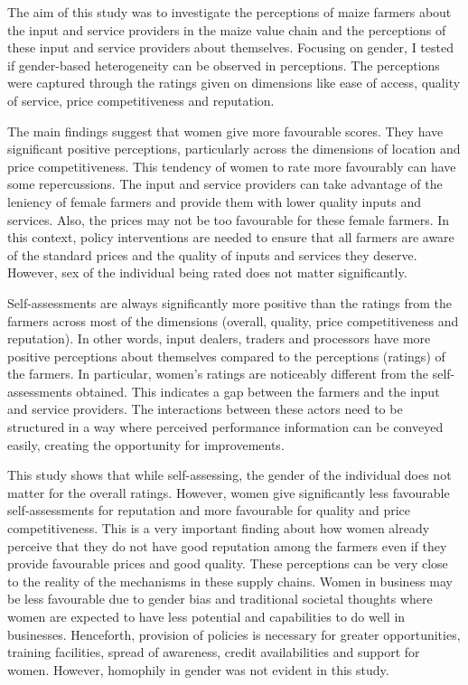 \documentclass[12pt,english]{article}\usepackage[]{graphicx}\usepackage[]{color}
\begin{document}
The aim of this study was to investigate the perceptions of maize
farmers about the input and service providers in the maize value chain
and the perceptions of these input and service providers about themselves.
Focusing on gender, I tested if gender-based heterogeneity can be
observed in perceptions. The perceptions were captured through the
ratings given on dimensions like ease of access, quality of service,
price competitiveness and reputation.

The main findings suggest that women give more favourable scores.
They have significant positive perceptions, particularly across the
dimensions of location and price competitiveness. This tendency of
women to rate more favourably can have some repercussions. The input
and service providers can take advantage of the leniency of female
farmers and provide them with lower quality inputs and services. Also,
the prices may not be too favourable for these female farmers. In
this context, policy interventions are needed to ensure that all farmers
are aware of the standard prices and the quality of inputs and services
they deserve. However, sex of the individual being rated does not
matter significantly. 

Self-assessments are always significantly more positive than the ratings
from the farmers across most of the dimensions (overall, quality,
price competitiveness and reputation). In other words, input dealers,
traders and processors have more positive perceptions about themselves
compared to the perceptions (ratings) of the farmers. In particular,
women's ratings are noticeably different from the self-assessments
obtained. This indicates a gap between the farmers and the input and
service providers. The interactions between these actors need to be
structured in a way where perceived performance information can be
conveyed easily, creating the opportunity for improvements. 

This study shows that while self-assessing, the gender of the individual
does not matter for the overall ratings. However, women give significantly
less favourable self-assessments for reputation and more favourable
for quality and price competitiveness. This is a very important finding
about how women already perceive that they do not have good reputation
among the farmers even if they provide favourable prices and good
quality. These perceptions can be very close to the reality of the
mechanisms in these supply chains. Women in business may be less favourable
due to gender bias and traditional societal thoughts where women are
expected to have less potential and capabilities to do well in businesses.
Henceforth, provision of policies is necessary for greater opportunities,
training facilities, spread of awareness, credit availabilities and
support for women. However, homophily in gender was not evident in
this study. 
\end{document}
